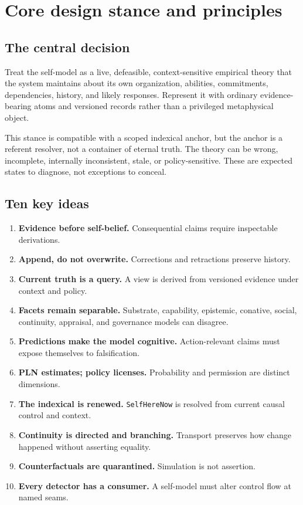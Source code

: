 \documentclass[11pt,oneside]{report}
\newcommand{\SelfHereNow}{\texttt{SelfHereNow}}
\begin{document}
\chapter{Core design stance and principles}

\section{The central decision}

\begin{decisionbox}
Treat the self-model as a live, defeasible, context-sensitive empirical theory that the system maintains about its own organization, abilities, commitments, dependencies, history, and likely responses. Represent it with ordinary evidence-bearing atoms and versioned records rather than a privileged metaphysical object.
\end{decisionbox}

This stance is compatible with a scoped indexical anchor, but the anchor is a referent resolver, not a container of eternal truth. The theory can be wrong, incomplete, internally inconsistent, stale, or policy-sensitive. These are expected states to diagnose, not exceptions to conceal.

\section{Ten key ideas}

\begin{enumerate}
  \item \textbf{Evidence before self-belief.} Consequential claims require inspectable derivations.
  \item \textbf{Append, do not overwrite.} Corrections and retractions preserve history.
  \item \textbf{Current truth is a query.} A view is derived from versioned evidence under context and policy.
  \item \textbf{Facets remain separable.} Substrate, capability, epistemic, conative, social, continuity, appraisal, and governance models can disagree.
  \item \textbf{Predictions make the model cognitive.} Action-relevant claims must expose themselves to falsification.
  \item \textbf{PLN estimates; policy licenses.} Probability and permission are distinct dimensions.
  \item \textbf{The indexical is renewed.} \SelfHereNow{} is resolved from current causal control and context.
  \item \textbf{Continuity is directed and branching.} Transport preserves how change happened without asserting equality.
  \item \textbf{Counterfactuals are quarantined.} Simulation is not assertion.
  \item \textbf{Every detector has a consumer.} A self-model must alter control flow at named seams.
\end{enumerate}
\end{document}
